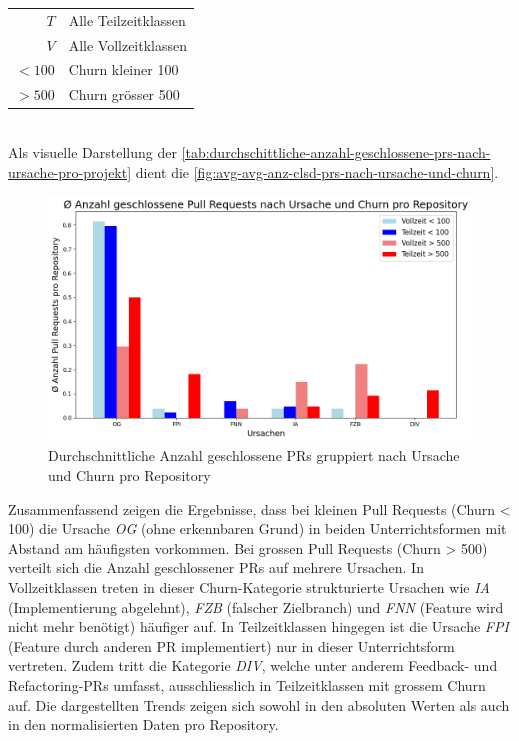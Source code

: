 \begin{tabular}{r l}
$T$ & Alle Teilzeitklassen \\
$V$ & Alle Vollzeitklassen \\
$< 100$ & Churn kleiner 100 \\
$> 500$ & Churn grösser 500 \\
\end{tabular}
\\

Als visuelle Darstellung der \autoref{tab:durchschittliche-anzahl-geschlossene-prs-nach-ursache-pro-projekt} dient die \autoref{fig:avg-avg-anz-clsd-prs-nach-ursache-und-churn}.

\begin{figure}[htbp]
    \includegraphics[width=\textwidth]{Figures/ursachenanalyse-pro-repo.png}
    \caption{Durchschnittliche Anzahl geschlossene PRs gruppiert nach Ursache und Churn pro Repository}
    \label{fig:avg-avg-anz-clsd-prs-nach-ursache-und-churn}
\end{figure}

Zusammenfassend zeigen die Ergebnisse, dass bei kleinen Pull Requests (Churn < 100) die Ursache \textit{OG} (ohne erkennbaren Grund) in beiden Unterrichtsformen mit Abstand am häufigsten vorkommen. Bei grossen Pull Requests (Churn > 500) verteilt sich die Anzahl geschlossener PRs auf mehrere Ursachen. In Vollzeitklassen treten in dieser Churn-Kategorie strukturierte Ursachen wie \textit{IA} (Implementierung abgelehnt), \textit{FZB} (falscher Zielbranch) und \textit{FNN} (Feature wird nicht mehr benötigt) häufiger auf. In Teilzeitklassen hingegen ist die Ursache \textit{FPI} (Feature durch anderen PR implementiert) nur in dieser Unterrichtsform vertreten. Zudem tritt die Kategorie \textit{DIV}, welche unter anderem Feedback- und Refactoring-PRs umfasst, ausschliesslich in Teilzeitklassen mit grossem Churn auf. Die dargestellten Trends zeigen sich sowohl in den absoluten Werten als auch in den normalisierten Daten pro Repository.
\pagebreak

